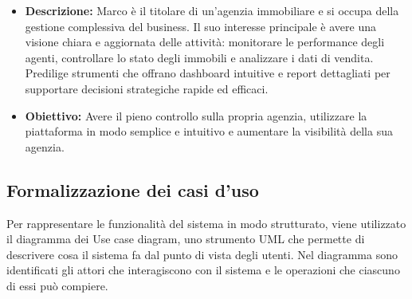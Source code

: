 \documentclass{article}
\begin{document}
\begin{itemize}
    \item \textbf{Descrizione:} Marco è il titolare di un'agenzia immobiliare e si occupa della gestione complessiva del business. Il suo interesse principale è avere una visione chiara e aggiornata delle attività: monitorare le performance degli agenti, controllare lo stato degli immobili e analizzare i dati di vendita. Predilige strumenti che offrano dashboard intuitive e report dettagliati per supportare decisioni strategiche rapide ed efficaci.

\item \textbf{Obiettivo:} Avere il pieno controllo sulla propria agenzia, 
utilizzare la piattaforma in modo semplice e intuitivo e aumentare 
la visibilità della sua agenzia.
\end{itemize}


\newpage
\subsection{Formalizzazione dei casi d'uso}
Per rappresentare le funzionalità del sistema in modo strutturato, viene utilizzato 
il diagramma dei Use case diagram, uno strumento UML che permette 
di descrivere cosa il sistema fa dal punto di vista degli utenti. Nel diagramma 
sono identificati gli attori che interagiscono con il sistema e le operazioni 
che ciascuno di essi può compiere.
\end{document}
